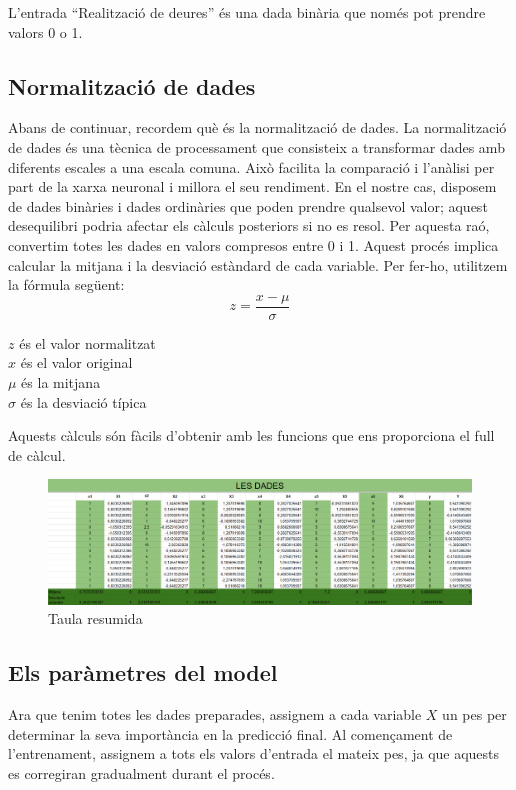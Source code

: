 L'entrada ``Realització de deures'' és una dada binària que només pot prendre valors 0 o 1.
\subsection{Normalització de dades}\label{subsec:24}
Abans de continuar, recordem què és la normalització de dades.
La normalització de dades és una tècnica de processament que consisteix a transformar dades amb diferents escales a una escala comuna. Això facilita la comparació i l’anàlisi per part de la xarxa neuronal i millora el seu rendiment. En el nostre cas, disposem de dades binàries i dades ordinàries que poden prendre qualsevol valor; aquest desequilibri podria afectar els càlculs posteriors si no es resol.
Per aquesta raó, convertim totes les dades en valors compresos entre 0 i 1. Aquest procés implica calcular la mitjana i la desviació estàndard de cada variable. Per fer-ho, utilitzem la fórmula següent:
$$z = \frac{x - \mu}{\sigma}$$
\begin{center}
    $z$ és el valor normalitzat\\
    $x$ és el valor original\\
    $\mu$ és la mitjana\\
    $\sigma$ és la desviació típica
\end{center}


Aquests càlculs són fàcils d'obtenir amb les funcions que ens proporciona el full de càlcul.

\begin{figure}[H]
    \centering
    \includegraphics[width=1\textwidth]{./figures/Dades_normalitzades.png}
    \caption{Taula resumida}
\end{figure}

\subsection{Els paràmetres del model}
Ara que tenim totes les dades preparades, assignem a cada variable $X$ un pes per determinar la seva importància en la predicció final. Al començament de l’entrenament, assignem a tots els valors d’entrada el mateix pes, ja que aquests es corregiran gradualment durant el procés.


